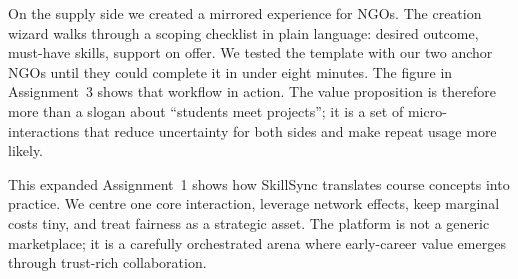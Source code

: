 On the supply side we created a mirrored experience for NGOs. The creation wizard walks through a scoping checklist in plain language: desired outcome, must-have skills, support on offer. We tested the template with our two anchor NGOs until they could complete it in under eight minutes. The figure in Assignment~3 shows that workflow in action. The value proposition is therefore more than a slogan about ``students meet projects''; it is a set of micro-interactions that reduce uncertainty for both sides and make repeat usage more likely.

This expanded Assignment~1 shows how SkillSync translates course concepts into practice. We centre one core interaction, leverage network effects, keep marginal costs tiny, and treat fairness as a strategic asset. The platform is not a generic marketplace; it is a carefully orchestrated arena where early-career value emerges through trust-rich collaboration.
